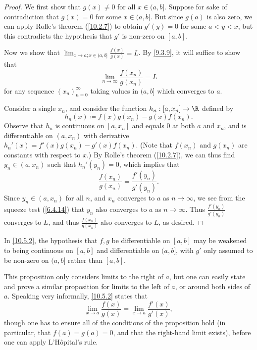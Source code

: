 \begin{proof}
  We first show that \(g(x) \neq 0\) for all \(x \in (a, b]\).
  Suppose for sake of contradiction that \(g(x) = 0\) for some \(x \in (a, b]\).
  But since \(g(a)\) is also zero, we can apply Rolle's theorem (\cref{10.2.7}) to obtain \(g'(y) = 0\) for some \(a < y < x\), but this contradicts the hypothesis that \(g'\) is non-zero on \([a, b]\).

  Now we show that \(\lim_{x \to a ; x \in (a, b]} \frac{f(x)}{g(x)} = L\).
  By \cref{9.3.9}, it will suffice to show that
  \[
    \lim_{n \to \infty} \frac{f(x_n)}{g(x_n)} = L
  \]
  for any sequence \((x_n)_{n = 0}^\infty\) taking values in \((a, b]\) which converges to \(a\).

  Consider a single \(x_n\), and consider the function \(h_n : [a, x_n] \to \R\) defined by
  \[
    h_n(x) \coloneqq f(x) g(x_n) - g(x) f(x_n).
  \]
  Observe that \(h_n\) is continuous on \([a, x_n]\) and equals \(0\) at both \(a\) and \(x_n\), and is differentiable on \((a, x_n)\) with derivative \(h_n'(x) = f'(x) g(x_n) - g'(x) f(x_n)\).
  (Note that \(f(x_n)\) and \(g(x_n)\) are constants with respect to \(x\).)
  By Rolle's theorem (\cref{10.2.7}), we can thus find \(y_n \in (a, x_n)\) such that \(h_n'(y_n) = 0\), which implies that
  \[
    \frac{f(x_n)}{g(x_n)} = \frac{f'(y_n)}{g'(y_n)}.
  \]
  Since \(y_n \in (a, x_n)\) for all \(n\), and \(x_n\) converges to \(a\) as \(n \to \infty\), we see from the squeeze test (\cref{6.4.14}) that \(y_n\) also converges to \(a\) as \(n \to \infty\).
  Thus \(\frac{f'(y_n)}{g'(y_n)}\) converges to \(L\), and thus \(\frac{f(x_n)}{g(x_n)}\) also converges to \(L\), as desired.
\end{proof}

\begin{note}
  In \cref{10.5.2}, the hypothesis that \(f, g\) be differentiable on \([a, b]\) may be weakened to being continuous on \([a, b]\) and differentiable on \((a, b]\), with \(g'\) only assumed to be non-zero on \((a, b]\) rather than \([a, b]\).
\end{note}

\begin{remark}\label{10.5.3}
  This proposition only considers limits to the right of \(a\), but one can easily state and prove a similar proposition for limits to the left of \(a\), or around both sides of \(a\).
  Speaking very informally, \cref{10.5.2} states that
  \[
    \lim_{x \to a} \frac{f(x)}{g(x)} = \lim_{x \to a} \frac{f'(x)}{g'(x)},
  \]
  though one has to ensure all of the conditions of the proposition hold (in particular, that \(f(a) = g(a) = 0\), and that the right-hand limit exists), before one can apply L'Hôpital's rule.
\end{remark}

